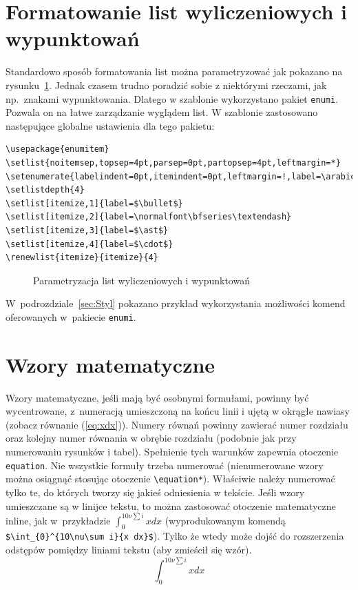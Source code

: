 \section{Formatowanie list wyliczeniowych i wypunktowań}
Standardowo sposób formatowania list można parametryzować jak pokazano na rysunku~\ref{fig:listlay}. Jednak czasem trudno poradzić sobie z niektórymi rzeczami, jak np.~znakami wypunktowania. Dlatego w szablonie wykorzystano pakiet \texttt{enumi}. Pozwala on na łatwe zarządzanie wyglądem list. W szablonie zastosowano następujące globalne ustawienia dla tego pakietu:
\begin{lstlisting}[basicstyle=\footnotesize\ttfamily]
\usepackage{enumitem} 
\setlist{noitemsep,topsep=4pt,parsep=0pt,partopsep=4pt,leftmargin=*} 
\setenumerate{labelindent=0pt,itemindent=0pt,leftmargin=!,label=\arabic*.} 
\setlistdepth{4} 
\setlist[itemize,1]{label=$\bullet$} 
\setlist[itemize,2]{label=\normalfont\bfseries\textendash}
\setlist[itemize,3]{label=$\ast$}
\setlist[itemize,4]{label=$\cdot$}
\renewlist{itemize}{itemize}{4}
\end{lstlisting}
\begin{figure}[b]
\centering
{}
\drawparameterstrue
\drawlist
\caption{Parametryzacja list wyliczeniowych i wypunktowań}\label{fig:listlay}
\end{figure}

W~podrozdziale~\ref{sec:Styl} pokazano przykład wykorzystania możliwości komend oferowanych w~pakiecie \texttt{enumi}.

\section{Wzory matematyczne}
Wzory matematyczne, jeśli mają być osobnymi formułami, powinny być wycentrowane, z~numeracją umieszczoną na końcu linii i ujętą w okrągłe nawiasy (zobacz równanie (\ref{eq:xdx})). Numery równań powinny zawierać numer rozdziału oraz kolejny numer równania w obrębie rozdziału (podobnie jak przy numerowaniu rysunków i tabel). Spełnienie tych warunków zapewnia otoczenie \verb?equation?. Nie wszystkie formuły trzeba numerować (nienumerowane wzory można osiągnąć stosując otoczenie \verb?\equation*?). Właściwie należy numerować tylko te, do których tworzy się jakieś odniesienia w tekście. Jeśli wzory umieszczane są w linijce tekstu, to można zastosować otoczenie matematyczne inline, jak w~przykładzie $\int_{0}^{10\nu\sum i}{x dx}$ (wyprodukowanym komendą \verb?$\int_{0}^{10\nu\sum i}{x dx}$?). Tylko że wtedy może dojść do rozszerzenia odstępów pomiędzy liniami tekstu (aby zmieścił się wzór).
\begin{equation}\label{eq:xdx}
\int_{0}^{10\nu\sum i}{x dx}
\end{equation}